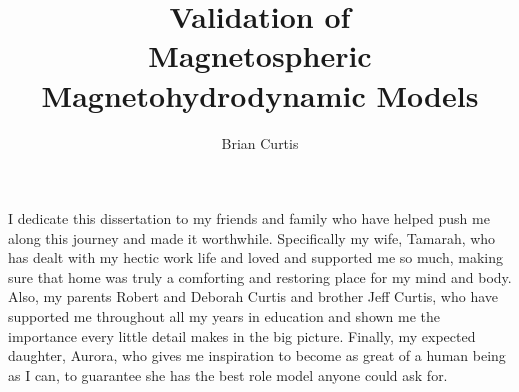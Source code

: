\documentclass[11 pt]{report}
\begin{document}
\title{Validation of \\ Magnetospheric Magnetohydrodynamic Models}
\author{Brian Curtis}













\signaturepage

\titlepage

\copyrightpage


\dedicationpage

\noindent I dedicate this dissertation to my friends and family who have helped
push me along this journey and made it worthwhile. Specifically my wife,
Tamarah, who has dealt with my hectic work life and loved and supported me so
much, making sure that home was truly a comforting and restoring place for my
mind and body. Also, my parents Robert and Deborah Curtis and brother Jeff
Curtis, who have supported me throughout all my years in education and shown me
the importance every little detail makes in the big picture. Finally, my
expected daughter, Aurora, who gives me inspiration to become as great of a
human being as I can, to guarantee she has the best role model anyone could ask
for.
\end{document}
